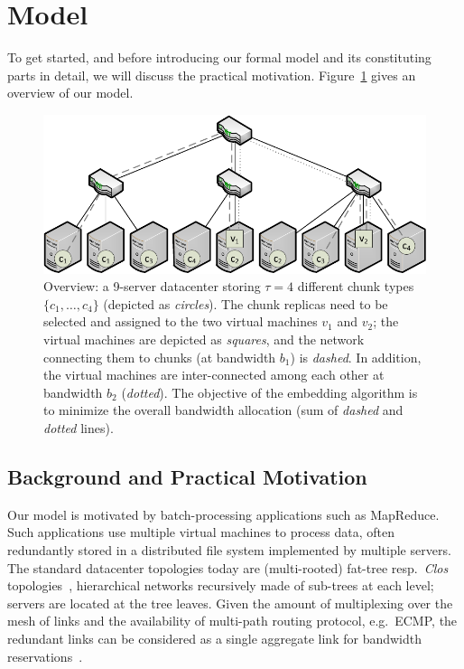 \documentclass[conference,10pt]{IEEEtran}
\newcommand{\CostTrans}{\ensuremath{b_1}}
\newcommand{\CostCom}{\ensuremath{b_2}}
\begin{document}
\section{Model}\label{sec:model}

To get started, and before introducing our formal model and its constituting parts in detail,
we will discuss the practical motivation.
Figure~\ref{fig:overview} gives an overview of our model.

\begin{figure}[t]
\centering
\includegraphics[width=0.99\columnwidth]{figs/data_locality_no_legend.pdf}
\vspace{-1em}
\caption{Overview: a 9-server datacenter storing $\tau=4$ different chunk
types $\{c_1,\ldots,c_4\}$ (depicted as \emph{circles}). The chunk replicas need to be selected and assigned to the two
 virtual machines $v_1$ and $v_2$; the virtual machines are depicted as \emph{squares}, and
 the network connecting them to chunks (at bandwidth $\CostTrans$) is \emph{dashed}. In addition, the virtual machines are inter-connected among
 each other at bandwidth $\CostCom$ (\emph{dotted}). The objective of the embedding algorithm is to minimize the overall bandwidth allocation
 (sum of \emph{dashed} and \emph{dotted} lines).}\label{fig:overview}
\vspace{-1em}
\end{figure}


\subsection{Background and Practical Motivation}

Our model is motivated by batch-processing applications such as MapReduce.
Such applications use multiple virtual machines to
process data, often redundantly stored in a distributed file system implemented
by multiple servers.~\cite{local-schedule-1,mapreduce}
The standard datacenter topologies today are (multi-rooted) fat-tree resp.~\emph{Clos} topologies~\cite{fattree,vl2},
hierarchical networks  recursively made of sub-trees at each level;
servers are located at the
tree leaves. Given the amount of multiplexing over the mesh of links
and the availability of multi-path routing protocol, e.g.~ECMP, the redundant
links can be considered as a single aggregate link for bandwidth
reservations~\cite{oktopus,proteus}.
\end{document}
